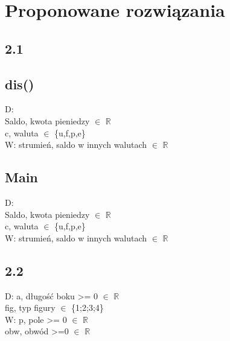 \documentclass[a4paper,twoside,7pt]{book}
\begin{document}

\section{Proponowane rozwiązania}
\subsection*{2.1}
\subsection*{dis()}
\begin{multicols}{2}
  \begin{flushleft}

    \end{flushleft}
D: \\
Saldo, kwota pieniedzy $\in$ $\mathbb{R}$\\
c, waluta $\in$ \{u,f,p,e\}\\
W: strumień, saldo w innych walutach $\in$ $\mathbb{R}$
    \begin{flushright}
    
    \end{flushright}
\end{multicols}
\newpage
\subsection*{Main}
\begin{multicols}{2}
  \begin{flushleft}

    \end{flushleft}
D: \\
Saldo, kwota pieniedzy $\in$ $\mathbb{R}$\\
c, waluta $\in$ \{u,f,p,e\}\\
W: strumień, saldo w innych walutach $\in$ $\mathbb{R}$
    \begin{flushright}
    
    \end{flushright}
\end{multicols}

\subsection*{2.2}
\begin{multicols}{2}
  \begin{flushleft}

    \end{flushleft}
D: a, długość boku >= 0 $\in$ $\mathbb{R}$\\
fig, typ figury $\in$ \{1;2;3;4\}\\
W: p, pole >= 0 $\in$ $\mathbb{R}$\\
obw, obwód >=0 $\in$ $\mathbb{R}$
    \begin{flushright}
    
    \end{flushright}    
\end{multicols}
\newpage
\end{document}

